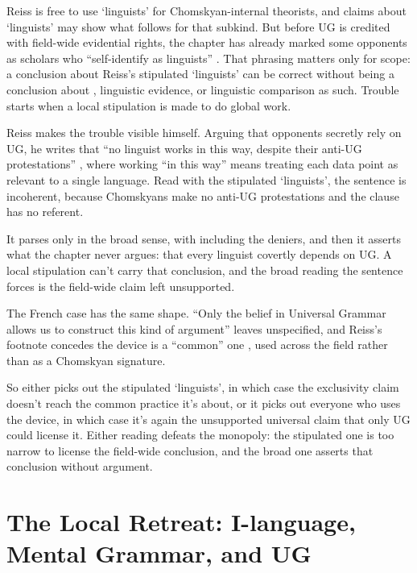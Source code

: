 \documentclass[12pt]{article}
\begin{document}
Reiss is free to use `linguists' for Chomskyan-internal theorists, and claims about `linguists' may show what follows for that subkind. But before UG is credited with field-wide evidential rights, the chapter has already marked some opponents as scholars who \enquote{self-identify as linguists} \citep[sec.~2]{reiss2026armchair}. That phrasing matters only for scope: a conclusion about Reiss's stipulated `linguists' can be correct without being a conclusion about , linguistic evidence, or linguistic comparison as such. Trouble starts when a local stipulation is made to do global work.

Reiss makes the trouble visible himself. Arguing that opponents secretly rely on UG, he writes that \enquote{no linguist works in this way, despite their anti-UG protestations} \citep[sec.~5.3.1]{reiss2026armchair}, where working \enquote{in this way} means treating each data point as relevant to a single language. Read with the stipulated `linguists', the sentence is incoherent, because Chomskyans make no anti-UG protestations and the clause has no referent.

It parses only in the broad sense, with  including the deniers, and then it asserts what the chapter never argues: that every linguist covertly depends on UG. A local stipulation can't carry that conclusion, and the broad reading the sentence forces is the field-wide claim left unsupported.

The French case has the same shape. \enquote{Only the belief in Universal Grammar allows us to construct this kind of argument} leaves  unspecified, and Reiss's footnote concedes the device is a \enquote{common} one \citep[sec.~5.3.3]{reiss2026armchair}, used across the field rather than as a Chomskyan signature.

So  either picks out the stipulated `linguists', in which case the exclusivity claim doesn't reach the common practice it's about, or it picks out everyone who uses the device, in which case it's again the unsupported universal claim that only UG could license it. Either reading defeats the monopoly: the stipulated one is too narrow to license the field-wide conclusion, and the broad one asserts that conclusion without argument.

\section{The Local Retreat: I-language, Mental Grammar, and UG}
\end{document}
